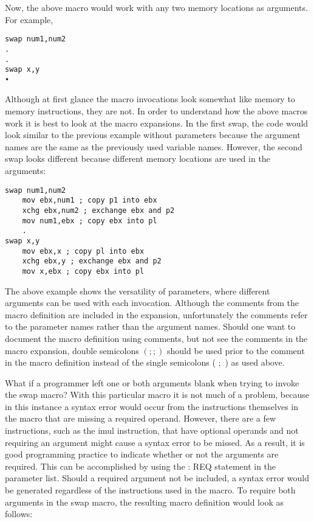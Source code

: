 \documentclass[10pt]{article}
\begin{document}
Now, the above macro would work with any two memory locations as arguments. For example,

\begin{verbatim}
swap num1,num2
.
.
swap x,y
•
\end{verbatim}

Although at first glance the macro invocations look somewhat like memory to memory instructions, they are not. In order to understand how the above macros work it is best to look at the macro expansions. In the first swap, the code would look similar to the previous example without parameters because the argument\\
names are the same as the previously used variable names. However, the second swap looks different because different memory locations are used in the arguments:

\begin{verbatim}
swap num1,num2
    mov ebx,num1 ; copy p1 into ebx
    xchg ebx,num2 ; exchange ebx and p2
    mov num1,ebx ; copy ebx into pl
    .
swap x,y
    mov ebx,x ; copy pl into ebx
    xchg ebx,y ; exchange ebx and p2
    mov x,ebx ; copy ebx into pl
\end{verbatim}

The above example shows the versatility of parameters, where different arguments can be used with each invocation. Although the comments from the macro definition are included in the expansion, unfortunately the comments refer to the parameter names rather than the argument names. Should one want to document the macro definition using comments, but not see the comments in the macro expansion, double semicolons $(; ;)$ should be used prior to the comment in the macro definition instead of the single semicolons ( $;$ ) as used above.

What if a programmer left one or both arguments blank when trying to invoke the swap macro? With this particular macro it is not much of a problem, because in this instance a syntax error would occur from the instructions themselves in the macro that are missing a required operand. However, there are a few instructions, such as the imul instruction, that have optional operands and not requiring an argument might cause a syntax error to be missed. As a result, it is good programming practice to indicate whether or not the arguments are required. This can be accomplished by using the : REQ statement in the parameter list. Should a required argument not be included, a syntax error would be generated regardless of the instructions used in the macro. To require both arguments in the swap macro, the resulting macro definition would look as follows:
\end{document}
